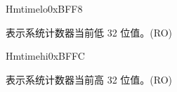 \begin{register}{H}{mtimelo}{0xBFF8}\label{regdesc:CLINTMTIMELOREG}
%
\regnewline%
\begin{regdesc}
\begin{reglist}
\label{fielddesc:CLINTMTIMELO}\item [MTIMELO] 表示系统计数器当前低 32 位值。(RO)
\end{reglist}
\end{regdesc}
\end{register}

\begin{register}{H}{mtimehi}{0xBFFC}\label{regdesc:CLINTMTIMEHIREG}
%
\regnewline%
\begin{regdesc}
\begin{reglist}
\label{fielddesc:CLINTMTIMEHI}\item [MTIMEHI] 表示系统计数器当前高 32 位值。(RO)
\end{reglist}
\end{regdesc}
\end{register}
